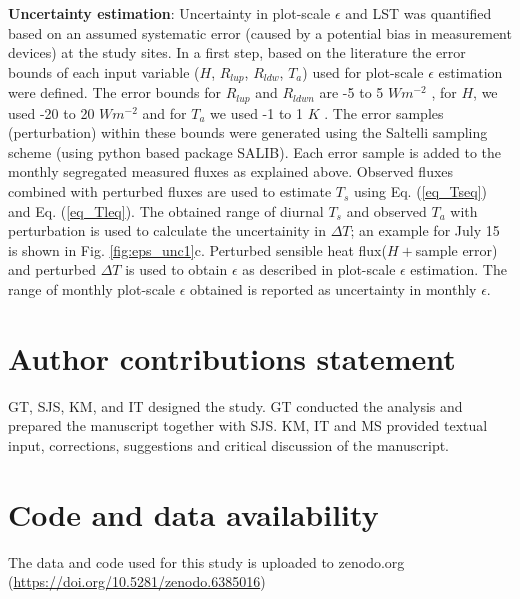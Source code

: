 \documentclass[fleqn,10pt]{wlscirep}
\begin{document}
\textbf{Uncertainty estimation}:
Uncertainty in plot-scale $\epsilon$ and LST was quantified based on an assumed systematic error (caused by a potential bias in measurement devices) at the study sites. In a first step, based on the literature \cite{trenberth2012tracking,foken2008energy} the error bounds of each input variable ($ H$, $R_{lup}$, $R_{ldw}$, $T_{a}$) used for plot-scale $\epsilon$ estimation were defined. The error bounds for $R_{lup}$ and $R_{ldwn}$ are -5 to 5 $Wm^{-2}$ \cite{trenberth2012tracking}, for $H$, we used -20 to 20 $Wm^{-2}$ and for $T_{a}$ we used -1 to 1 $K$ \cite{foken2008energy}. The error samples (perturbation) within these bounds were generated using the Saltelli sampling scheme (using python based package SALIB\cite{saltelli2017new}). Each error sample is added to the monthly segregated measured fluxes as explained above. Observed fluxes combined with perturbed fluxes are used to estimate $T_{s}$ using Eq. (\ref{eq_Tseq}) and  Eq. (\ref{eq_Tleq}). The obtained range of diurnal $T_{s}$ and observed $T_{a}$ with perturbation is used to calculate the uncertainity in $\Delta T$; an example for July 15 is shown in Fig. \ref{fig:eps_unc1}c. Perturbed sensible heat flux($H + $sample error) and perturbed $\Delta T$ is used to obtain $\epsilon$ as described in plot-scale $\epsilon$ estimation. The range of monthly plot-scale $\epsilon$ obtained is reported as uncertainty in monthly $\epsilon$. 
\section{Author contributions statement}
GT, SJS, KM, and IT designed the study. GT conducted the analysis and prepared the manuscript together with SJS. KM, IT and MS provided textual input, corrections, suggestions and critical discussion of the manuscript.
\section{Code and data availability}
The data and code used for this study is uploaded to zenodo.org (\url{https://doi.org/10.5281/zenodo.6385016})
\end{document}
